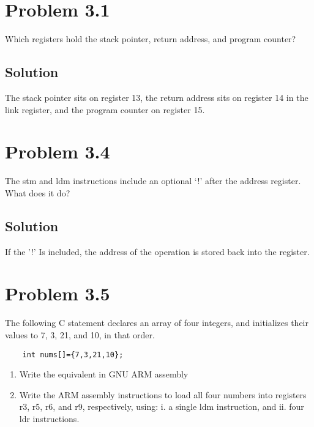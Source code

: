 \documentclass[letterpaper,11pt]{texMemo} %
\begin{document}
\maketitle %


\section*{Problem 3.1}
Which registers hold the stack pointer, return address, and program counter?
\subsection*{Solution}
The stack pointer sits on register 13, the return address sits on register 14 in the link 
register, and the program counter on register 15.


\section*{Problem 3.4}
The stm and ldm instructions include an optional ‘!’ after the address register. What does
it do?
\subsection*{Solution}
If the '!' Is included, the address of the operation is stored back into the register.

\section*{Problem 3.5}
The following C statement declares an array of four integers, and initializes their values
to 7, 3, 21, and 10, in that order.
\begin{lstlisting}
    int nums[]={7,3,21,10};
\end{lstlisting}
\begin{enumerate}[label=\Alph*]
    \item Write the equivalent in GNU ARM assembly
    \item Write the ARM assembly instructions to load all four numbers into registers r3, r5, r6, and r9, respectively, using:
    i. a single ldm instruction, and
    ii. four ldr instructions.
\end{enumerate}
\end{document}
